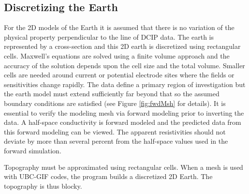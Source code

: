 \subsection{Discretizing the Earth}
For the 2D models of the Earth it is assumed that there is no variation of the physical property perpendicular to the line of DCIP data. The earth is represented by a cross-section and this 2D earth is discretized using rectangular cells. Maxwell's equations are solved using a finite volume approach and the accuracy of the solution depends upon the cell size and the total volume. Smaller cells are needed around current or potential electrode sites where the fields or sensitivities change rapidly. The data define a primary region of investigation but the earth model must extend sufficiently far beyond that so the assumed boundary conditions are satisfied (see Figure \ref{fig:fwdMsh} for details). It is essential to verify the modeling mesh via forward modeling prior to inverting the data. A half-space conductivity is forward modeled and the predicted data from this forward modeling can be viewed. The apparent resistivities should not deviate by more than several percent from the half-space values used in the forward simulation.

Topography must be approximated using rectangular cells. When a  mesh is used with UBC-GIF codes, the program builds a discretized 2D Earth. The topography is thus blocky.

